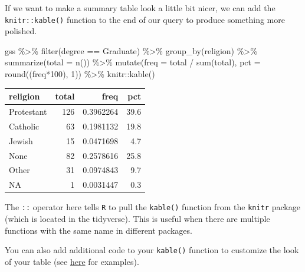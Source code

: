 \documentclass[
  letterpaper,
]{book}
\newenvironment{Shaded}{\begin{snugshade}}{\end{snugshade}}
\newcommand{\AttributeTok}[1]{\textcolor[rgb]{0.40,0.45,0.13}{#1}}
\newcommand{\DecValTok}[1]{\textcolor[rgb]{0.68,0.00,0.00}{#1}}
\newcommand{\FunctionTok}[1]{\textcolor[rgb]{0.28,0.35,0.67}{#1}}
\newcommand{\NormalTok}[1]{\textcolor[rgb]{0.00,0.23,0.31}{#1}}
\newcommand{\SpecialCharTok}[1]{\textcolor[rgb]{0.37,0.37,0.37}{#1}}
\newcommand{\StringTok}[1]{\textcolor[rgb]{0.13,0.47,0.30}{#1}}
\begin{document}
If we want to make a summary table look a little bit nicer, we can add
the \texttt{knitr::kable()} function to the end of our query to produce
something more polished.

\begin{Shaded}
\begin{Highlighting}[]
\NormalTok{gss }\SpecialCharTok{\%\textgreater{}\%}
  \FunctionTok{filter}\NormalTok{(degree }\SpecialCharTok{==} \StringTok{\textquotesingle{}Graduate\textquotesingle{}}\NormalTok{) }\SpecialCharTok{\%\textgreater{}\%}
  \FunctionTok{group\_by}\NormalTok{(religion) }\SpecialCharTok{\%\textgreater{}\%}
  \FunctionTok{summarize}\NormalTok{(}\AttributeTok{total =} \FunctionTok{n}\NormalTok{()) }\SpecialCharTok{\%\textgreater{}\%}
  \FunctionTok{mutate}\NormalTok{(}\AttributeTok{freq =}\NormalTok{ total }\SpecialCharTok{/} \FunctionTok{sum}\NormalTok{(total),}
         \AttributeTok{pct =} \FunctionTok{round}\NormalTok{((freq}\SpecialCharTok{*}\DecValTok{100}\NormalTok{), }\DecValTok{1}\NormalTok{)) }\SpecialCharTok{\%\textgreater{}\%}
\NormalTok{  knitr}\SpecialCharTok{::}\FunctionTok{kable}\NormalTok{()}
\end{Highlighting}
\end{Shaded}

\begin{longtable}[]{@{}lrrr@{}}
\toprule\noalign{}
religion & total & freq & pct \\
\midrule\noalign{}
\endhead
\bottomrule\noalign{}
\endlastfoot
Protestant & 126 & 0.3962264 & 39.6 \\
Catholic & 63 & 0.1981132 & 19.8 \\
Jewish & 15 & 0.0471698 & 4.7 \\
None & 82 & 0.2578616 & 25.8 \\
Other & 31 & 0.0974843 & 9.7 \\
NA & 1 & 0.0031447 & 0.3 \\
\end{longtable}

The \texttt{::} operator here tells \texttt{R} to pull the
\texttt{kable()} function from the \texttt{knitr} package (which is
located in the tidyverse). This is useful when there are multiple
functions with the same name in different packages.

You can also add additional code to your \texttt{kable()} function to
customize the look of your table (see
\href{https://cran.r-project.org/web/packages/kableExtra/vignettes/awesome_table_in_html.html}{here}
for examples).
\end{document}

